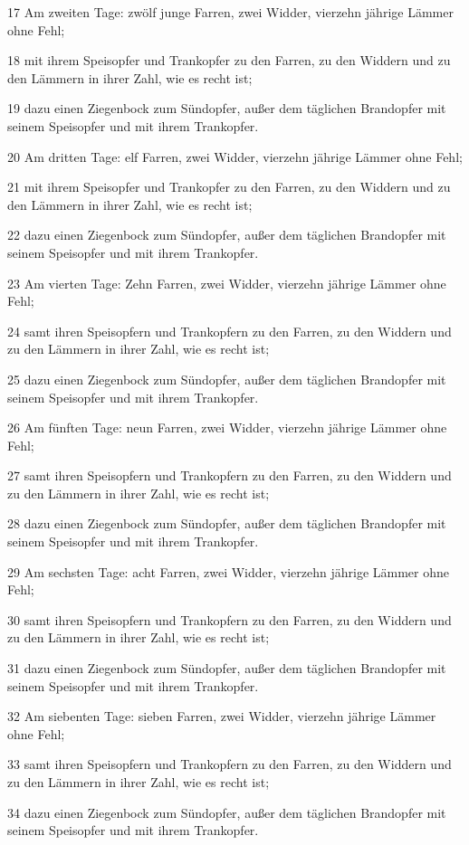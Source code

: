 \par 17 Am zweiten Tage: zwölf junge Farren, zwei Widder, vierzehn jährige Lämmer ohne Fehl;
\par 18 mit ihrem Speisopfer und Trankopfer zu den Farren, zu den Widdern und zu den Lämmern in ihrer Zahl, wie es recht ist;
\par 19 dazu einen Ziegenbock zum Sündopfer, außer dem täglichen Brandopfer mit seinem Speisopfer und mit ihrem Trankopfer.
\par 20 Am dritten Tage: elf Farren, zwei Widder, vierzehn jährige Lämmer ohne Fehl;
\par 21 mit ihrem Speisopfer und Trankopfer zu den Farren, zu den Widdern und zu den Lämmern in ihrer Zahl, wie es recht ist;
\par 22 dazu einen Ziegenbock zum Sündopfer, außer dem täglichen Brandopfer mit seinem Speisopfer und mit ihrem Trankopfer.
\par 23 Am vierten Tage: Zehn Farren, zwei Widder, vierzehn jährige Lämmer ohne Fehl;
\par 24 samt ihren Speisopfern und Trankopfern zu den Farren, zu den Widdern und zu den Lämmern in ihrer Zahl, wie es recht ist;
\par 25 dazu einen Ziegenbock zum Sündopfer, außer dem täglichen Brandopfer mit seinem Speisopfer und mit ihrem Trankopfer.
\par 26 Am fünften Tage: neun Farren, zwei Widder, vierzehn jährige Lämmer ohne Fehl;
\par 27 samt ihren Speisopfern und Trankopfern zu den Farren, zu den Widdern und zu den Lämmern in ihrer Zahl, wie es recht ist;
\par 28 dazu einen Ziegenbock zum Sündopfer, außer dem täglichen Brandopfer mit seinem Speisopfer und mit ihrem Trankopfer.
\par 29 Am sechsten Tage: acht Farren, zwei Widder, vierzehn jährige Lämmer ohne Fehl;
\par 30 samt ihren Speisopfern und Trankopfern zu den Farren, zu den Widdern und zu den Lämmern in ihrer Zahl, wie es recht ist;
\par 31 dazu einen Ziegenbock zum Sündopfer, außer dem täglichen Brandopfer mit seinem Speisopfer und mit ihrem Trankopfer.
\par 32 Am siebenten Tage: sieben Farren, zwei Widder, vierzehn jährige Lämmer ohne Fehl;
\par 33 samt ihren Speisopfern und Trankopfern zu den Farren, zu den Widdern und zu den Lämmern in ihrer Zahl, wie es recht ist;
\par 34 dazu einen Ziegenbock zum Sündopfer, außer dem täglichen Brandopfer mit seinem Speisopfer und mit ihrem Trankopfer.
